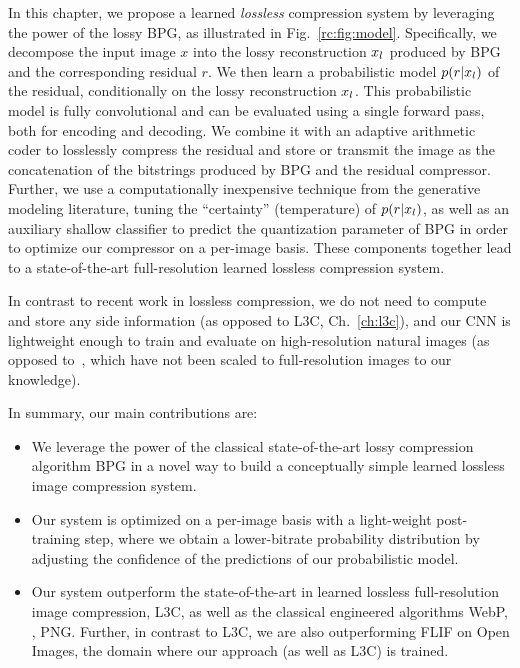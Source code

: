 In this chapter, we propose a learned \emph{lossless} compression system by leveraging the power of the lossy BPG, as illustrated in Fig.~\ref{rc:fig:model}. 
Specifically, we decompose the input image $x$ into the lossy reconstruction $x_l$ produced by BPG and the corresponding residual $r$. We then learn a probabilistic model $p(r|x_l)$ of the residual, conditionally on the lossy reconstruction $x_l$. This probabilistic model is fully convolutional and can be evaluated using a single forward pass, both for encoding and decoding. We combine it with an adaptive arithmetic coder to losslessly compress the residual and store or transmit the image as the concatenation of the bitstrings produced by BPG and the residual compressor. Further, we use a computationally inexpensive technique from the generative modeling literature, tuning the ``certainty'' (temperature) of $p(r|x_l)$, as well as an auxiliary shallow classifier to predict the quantization parameter of BPG in order to optimize our compressor on a per-image basis. These components together lead to a state-of-the-art full-resolution learned lossless compression system.

In contrast to recent work in lossless compression, we do not need to compute and store any side information (as opposed to L3C, Ch.~\ref{ch:l3c}), and our CNN is lightweight enough to train and evaluate on high-resolution natural images (as opposed to~\cite{hoogeboom2019integer, kingma2019bit}, which have not been scaled to full-resolution images to our knowledge).

In summary, our main contributions are:
\begin{itemize}[leftmargin=*,parsep=0pt,itemsep=0pt,topsep=1pt]
    \item We leverage the power of the classical state-of-the-art lossy compression algorithm BPG in a novel way to build a conceptually simple learned lossless image compression system.
    \item Our system is optimized on a per-image basis with a light-weight post-training step, where we obtain a lower-bitrate probability distribution by adjusting the confidence of the predictions of our probabilistic model.
    \item Our system outperform the state-of-the-art in learned lossless full-resolution image compression, L3C, as well as the classical engineered algorithms WebP, \jpegk, PNG. Further, in contrast to L3C, we are also outperforming FLIF on Open Images, the domain where our approach (as well as L3C) is trained.
\end{itemize}

